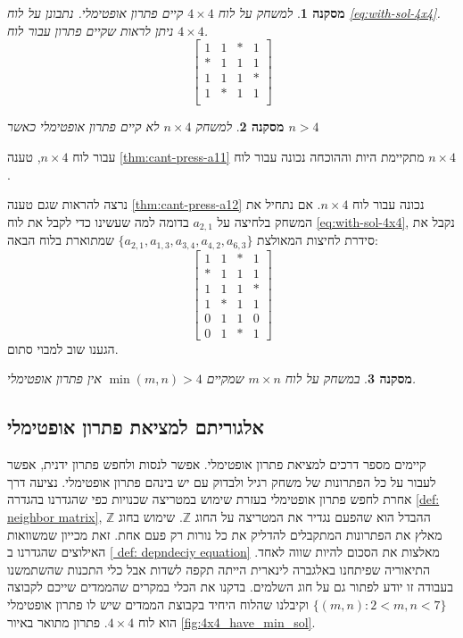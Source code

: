 \documentclass[12pt,leqno]{article}
\theoremstyle{theoremdd}
\newtheorem{corollary}{מסקנה}[section]
\begin{document}
\begin{corollary}
    למשחק על לוח 
    $4 \times 4$
    קיים פתרון אופטימלי.
    נתבונן על לוח 
    \ref{eq:with-sol-4x4}.
    ניתן לראות שקיים פתרון עבור 
    לוח 
    $4 \times 4$.
    \[
    \begin{bmatrix}
        1 & 1 & * & 1\\
        * & 1 & 1 & 1\\
        1 & 1 & 1 & *\\
        1 & * & 1 & 1\\
    \end{bmatrix}
    \]
\end{corollary}
\begin{corollary}
    למשחק 
    $ n \times 4$
    לא קיים פתרון אופטימלי
    כאשר 
    $n > 4$
\end{corollary}
עבור לוח 
$ n \times 4$,
טענה
\ref{thm:cant-press-a11}
מתקיימת היות וההוכחה נכונה עבור לוח 
$ n \times 4$. 

נרצה להראות שגם טענה 
\ref{thm:cant-press-a12}
נכונה עבור לוח 
$ n \times 4$.
אם 
נתחיל את המשחק 
בלחיצה על 
$a_{2,1}$
בדומה למה שעשינו כדי לקבל את לוח 
\ref{eq:with-sol-4x4},
נקבל את סידרת לחיצות המאולצת
$\{a_{2,1}, a_{1,3}, a_{3,4}, a_{4,2}, a_{6,3}\}$
שמתוארת בלוח הבאה:
\[
    \begin{bmatrix}
        1 & 1 & * & 1\\
        * & 1 & 1 & 1\\
        1 & 1 & 1 & *\\
        1 & * & 1 & 1\\
        0 & 1 & 1 & 0\\
        0 & 1 & * & 1
    \end{bmatrix}
\]
הגענו שוב למבוי סתום.
\begin{corollary}
    \label{thrm: bigger then 7x7 board no minimal solution}
    במשחק על לוח 
    $m \times n$
    שמקיים
    $\min(m,n) > 4$
    אין פתרון אופטימלי.
\end{corollary}

\subsection{אלגוריתם למציאת פתרון אופטימלי}
קיימים מספר דרכים למציאת פתרון אופטימלי.
אפשר לנסות ולחפש פתרון ידנית,
אפשר לעבור על כל הפתרונות של משחק רגיל ולבדוק עם יש בינהם פתרון 
אופטימלי.
נציעה דרך אחרת לחפש פתרון 
אופטימלי
בעזרת שימוש במטריצה שכנויות כפי שהגדרנו
בהגדרה 
\ref{def: neighbor matrix},
ההבדל הוא שהפעם נגדיר את המטריצה על החוג 
$\mathbb{Z}$.
שימוש בחוג 
$\mathbb{Z}$
מאלץ את הפתרונות המתקבלים
להדליק את כל נורות רק פעם אחת.
זאת מכייון שמשוואות האילוצים שהגדרנו ב
\ref{ def: depndeciy equation}
מאלצות את הסכום להיות שווה לאחד.
התיאוריה שפיתחנו באלגברה לינארית הייתה תקפה לשדות 
אבל כלי התכנות שהשתמשנו
בעבודה זו יודע לפתור גם על חוג השלמים.
בדקנו את הכלי במקרים
שהממדים שייכם לקבוצה 
$\{ (m,n) : 2 < m,n <7 \}$
וקיבלנו שהלוח
היחיד בקבוצת הממדים שיש לו פתרון אופטימלי 
הוא
לוח 
$4 \times 4$.
פתרון מתואר באיור 
\ref{fig:4x4_have_min_sol}.
\end{document}
